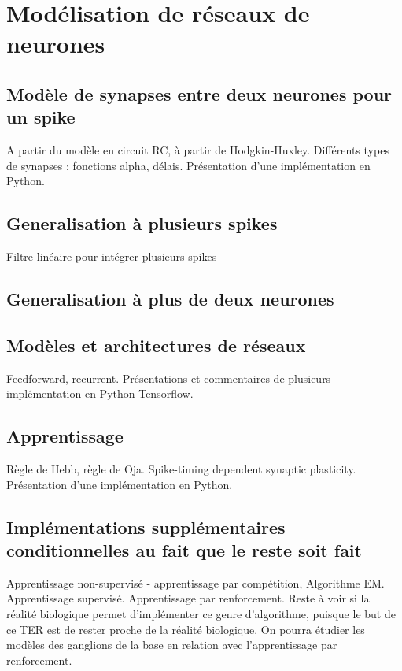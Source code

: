 \documentclass[12pt]{scrartcl}
\begin{document}
\section{Modélisation de réseaux de neurones}\label{modr}

\subsection{Modèle de synapses entre deux neurones pour un spike} A partir du modèle en circuit RC, à partir de Hodgkin-Huxley. Différents types de synapses : fonctions alpha, délais. Présentation d'une implémentation en Python.

\subsection{Generalisation à plusieurs spikes} Filtre linéaire pour intégrer plusieurs spikes

\subsection{Generalisation à plus de deux neurones}

\subsection{Modèles et architectures de réseaux} Feedforward, recurrent. Présentations et commentaires de plusieurs implémentation en Python-Tensorflow.

\subsection{Apprentissage} Règle de Hebb, règle de Oja. Spike-timing dependent synaptic plasticity. Présentation d'une implémentation en Python.

\subsection{Implémentations supplémentaires conditionnelles au fait que le reste soit fait} Apprentissage non-supervisé - apprentissage par compétition, Algorithme EM. Apprentissage supervisé. Apprentissage par renforcement. Reste à voir si la réalité biologique permet d'implémenter ce genre d'algorithme, puisque le but de ce TER est de rester proche de la réalité biologique. On pourra étudier les modèles des ganglions de la base en relation avec l'apprentissage par renforcement.
\end{document}

